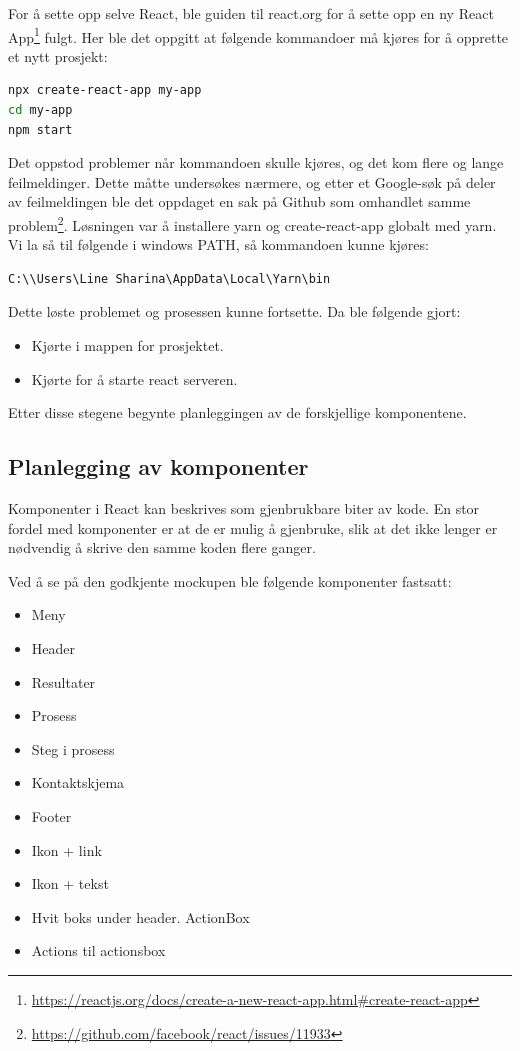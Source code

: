 For å sette opp selve React, ble  guiden til react.org for å sette opp en ny React App\footnote{\url{https://reactjs.org/docs/create-a-new-react-app.html\#create-react-app}} fulgt. Her ble det oppgitt at følgende kommandoer må kjøres for å opprette et nytt prosjekt:
\begin{lstlisting}[caption={Oppretting av React App},language=bash]
npx create-react-app my-app
cd my-app
npm start
\end{lstlisting}

Det oppstod problemer når kommandoen  skulle kjøres, og det kom flere og lange feilmeldinger. Dette måtte undersøkes nærmere, og etter et Google-søk på deler av feilmeldingen ble det oppdaget en sak på Github som omhandlet samme problem\footnote{\url{https://github.com/facebook/react/issues/11933}}.
Løsningen var å installere yarn og create-react-app globalt med yarn. Vi la så til følgende i windows PATH, så kommandoen kunne kjøres:
\begin{lstlisting}
C:\\Users\Line Sharina\AppData\Local\Yarn\bin
\end{lstlisting}
Dette løste problemet og prosessen kunne fortsette. Da ble følgende gjort:

\begin{itemize}
    \item Kjørte  i mappen for prosjektet.
    \item Kjørte  for å starte react serveren.
\end{itemize}

Etter disse stegene begynte planleggingen av de forskjellige komponentene.

\subsection{Planlegging av komponenter}
Komponenter i React kan beskrives som gjenbrukbare biter av kode. En stor fordel med komponenter er at de er mulig å gjenbruke, slik at det ikke lenger er nødvendig å skrive den samme koden flere ganger. 

Ved å se på den godkjente mockupen ble følgende komponenter fastsatt: 
\begin{itemize}
    \item Meny
    \item Header
    \item Resultater
    \item Prosess
    \item Steg i prosess
    \item Kontaktskjema
    \item Footer
    \item Ikon + link
    \item Ikon + tekst
    \item Hvit boks under header. ActionBox
    \item Actions til actionsbox
\end{itemize}

